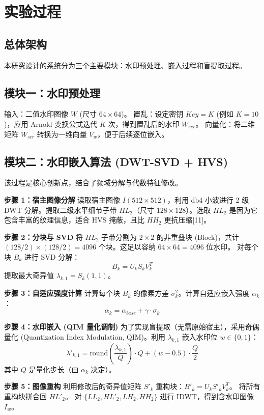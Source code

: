 \documentclass[zihao=-4, a4paper]{ctexart} %
\begin{document}
	\section{实验过程}
	
	\subsection{总体架构}
	本研究设计的系统分为三个主要模块：水印预处理、嵌入过程和盲提取过程。
	
	\subsection{模块一：水印预处理}
	输入：二值水印图像 $W$ (尺寸 $64 \times 64$)。
	置乱：设定密钥 $Key = K$ (例如 $K=10$)，应用 Arnold 变换公式迭代 $K$ 次，得到置乱后的水印 $W_{scr}$。
	向量化：将二维矩阵 $W_{scr}$ 转换为一维向量 $V_w$，便于后续逐位嵌入。
	
	\subsection{模块二：水印嵌入算法 (DWT-SVD + HVS)}
	该过程是核心创新点，结合了频域分解与代数特征修改。
	
	\textbf{步骤 1：宿主图像分解}
	读取宿主图像 $I (512 \times 512)$，利用 db4 小波进行 2 级 DWT 分解。提取二级水平细节子带 $HL_2$（尺寸 $128 \times 128$）。选取 $HL_2$ 是因为它包含丰富的纹理信息，适合 HVS 掩蔽，且比 $HH_2$ 更抗压缩[11]。
	
	\textbf{步骤 2：分块与 SVD}
	将 $HL_2$ 子带分割为 $2 \times 2$ 的非重叠块 (Block)，共计 $(128/2) \times (128/2) = 4096$ 个块。这足以容纳 $64 \times 64 = 4096$ 位水印。
	对每个块 $B_k$ 进行 SVD 分解：
	\[ B_k = U_k S_k V_k^T \]
	提取最大奇异值 $\lambda_{k,1} = S_k(1,1)$。
	
	\textbf{步骤 3：自适应强度计算}
	计算每个块 $B_k$ 的像素方差 $\sigma_k^2$。计算自适应嵌入强度 $\alpha_k$：
	\[ \alpha_k = \alpha_{base} + \gamma \cdot \sigma_k \]
	
	\textbf{步骤 4：水印嵌入 (QIM 量化调制)}
	为了实现盲提取（无需原始宿主），采用奇偶量化 (Quantization Index Modulation, QIM)。利用 $\lambda_{k,1}$ 嵌入水印位 $w \in \{0, 1\}$：
	\begin{equation}
		\lambda'_{k,1} = \text{round}(\frac{\lambda_{k,1}}{Q}) \cdot Q + (w - 0.5) \cdot \frac{Q}{2}
	\end{equation}
	其中 $Q$ 是量化步长（由 $\alpha_k$ 决定）。
	
	\textbf{步骤 5：图像重构}
	利用修改后的奇异值矩阵 $S'_k$ 重构块：$B'_k = U_k S'_k V_k^T$。
	将所有重构块拼合回 $HL'_2$。
	对 $\{LL_2, HL'_2, LH_2, HH_2\}$ 进行 IDWT，得到含水印图像 $I_w$。
	
\end{document}
